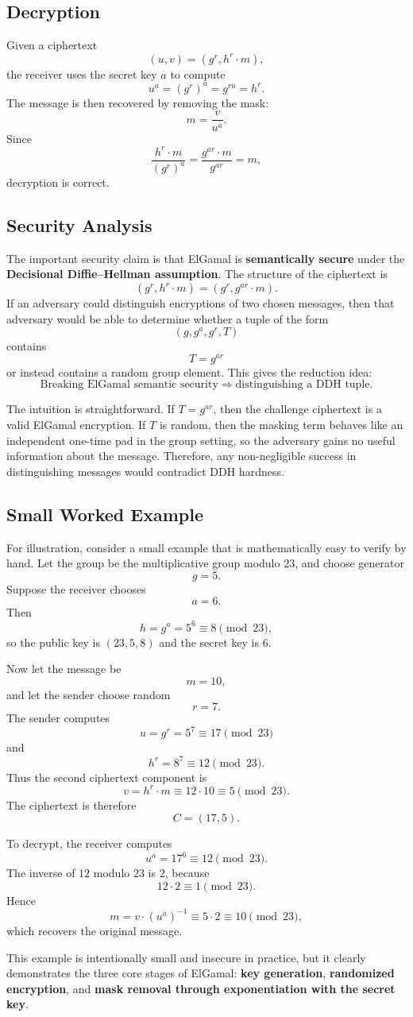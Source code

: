 \subsection{Decryption}

Given a ciphertext
\[
(u,v) = (g^r,h^r \cdot m),
\]
the receiver uses the secret key $a$ to compute
\[
u^a = (g^r)^a = g^{ra} = h^r.
\]
The message is then recovered by removing the mask:
\[
m = \frac{v}{u^a}.
\]
Since
\[
\frac{h^r \cdot m}{(g^r)^a} = \frac{g^{ar}\cdot m}{g^{ar}} = m,
\]
decryption is correct.

\subsection{Security Analysis}

The important security claim is that ElGamal is \textbf{semantically secure} under the \textbf{Decisional Diffie--Hellman assumption}. The structure of the ciphertext is
\[
(g^r, h^r \cdot m) = (g^r, g^{ar}\cdot m).
\]
If an adversary could distinguish encryptions of two chosen messages, then that adversary would be able to determine whether a tuple of the form
\[
(g,g^a,g^r,T)
\]
contains
\[
T = g^{ar}
\]
or instead contains a random group element. This gives the reduction idea:
\[
\text{Breaking ElGamal semantic security} \Longrightarrow \text{distinguishing a DDH tuple}.
\]

The intuition is straightforward. If $T=g^{ar}$, then the challenge ciphertext is a valid ElGamal encryption. If $T$ is random, then the masking term behaves like an independent one-time pad in the group setting, so the adversary gains no useful information about the message. Therefore, any non-negligible success in distinguishing messages would contradict DDH hardness.

\subsection{Small Worked Example}

For illustration, consider a small example that is mathematically easy to verify by hand. Let the group be the multiplicative group modulo $23$, and choose generator
\[
g = 5.
\]
Suppose the receiver chooses
\[
a = 6.
\]
Then
\[
h = g^a = 5^6 \equiv 8 \pmod{23},
\]
so the public key is $(23,5,8)$ and the secret key is $6$.

Now let the message be
\[
m = 10,
\]
and let the sender choose random
\[
r = 7.
\]
The sender computes
\[
u = g^r = 5^7 \equiv 17 \pmod{23}
\]
and
\[
h^r = 8^7 \equiv 12 \pmod{23}.
\]
Thus the second ciphertext component is
\[
v = h^r \cdot m \equiv 12 \cdot 10 \equiv 5 \pmod{23}.
\]
The ciphertext is therefore
\[
C = (17,5).
\]

To decrypt, the receiver computes
\[
u^a = 17^6 \equiv 12 \pmod{23}.
\]
The inverse of $12$ modulo $23$ is $2$, because
\[
12 \cdot 2 \equiv 1 \pmod{23}.
\]
Hence
\[
m = v \cdot (u^a)^{-1} \equiv 5 \cdot 2 \equiv 10 \pmod{23},
\]
which recovers the original message.

This example is intentionally small and insecure in practice, but it clearly demonstrates the three core stages of ElGamal: \textbf{key generation}, \textbf{randomized encryption}, and \textbf{mask removal through exponentiation with the secret key}.
